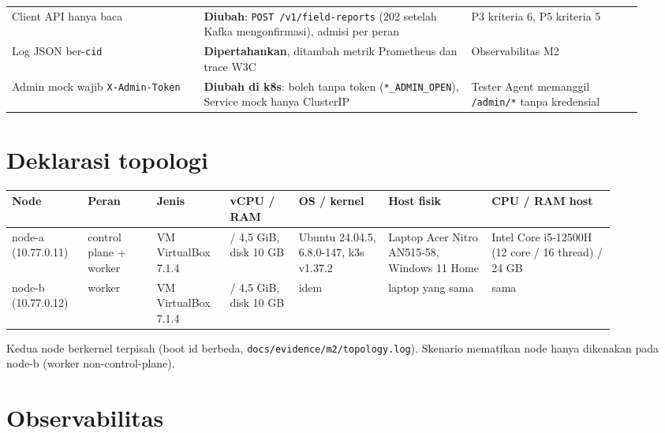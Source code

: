 {\begin{longtable}{@{}>{\raggedright\arraybackslash}p{0.284\linewidth}>{\raggedright\arraybackslash}p{0.398\linewidth}>{\raggedright\arraybackslash}p{0.252\linewidth}@{}}
Client API hanya baca & \textbf{Diubah}: \texttt{POST /\allowbreak{}v1/\allowbreak{}field-\allowbreak{}reports} (202 setelah Kafka mengonfirmasi), admisi per peran & P3 kriteria 6, P5 kriteria 5 \\
Log JSON ber-\texttt{cid} & \textbf{Dipertahankan}, ditambah metrik Prometheus dan trace W3C & Observabilitas M2 \\
Admin mock wajib \texttt{X-\allowbreak{}Admin-\allowbreak{}Token} & \textbf{Diubah di k8s}: boleh tanpa token (\texttt{*\_\allowbreak{}ADMIN\_\allowbreak{}OPEN}), Service mock hanya ClusterIP & Tester Agent memanggil \texttt{/\allowbreak{}admin/\allowbreak{}*} tanpa kredensial \\
\bottomrule
\end{longtable}
}

\section{Deklarasi topologi}

{\small
\begin{longtable}{@{}>{\raggedright\arraybackslash}p{0.104\linewidth}>{\raggedright\arraybackslash}p{0.104\linewidth}>{\raggedright\arraybackslash}p{0.104\linewidth}>{\raggedright\arraybackslash}p{0.104\linewidth}>{\raggedright\arraybackslash}p{0.135\linewidth}>{\raggedright\arraybackslash}p{0.154\linewidth}>{\raggedright\arraybackslash}p{0.181\linewidth}@{}}
\toprule
\textbf{Node} & \textbf{Peran} & \textbf{Jenis} & \textbf{vCPU / RAM} & \textbf{OS / kernel} & \textbf{Host fisik} & \textbf{CPU / RAM host} \\
\midrule
\endhead
node-a (10.77.0.11) & control plane + worker & VM VirtualBox 7.1.4 & 4 / 4,5 GiB, disk 10 GB & Ubuntu 24.04.5, 6.8.0-147, k3s v1.37.2 & Laptop Acer Nitro AN515-58, Windows 11 Home & Intel Core i5-12500H (12 core / 16 thread) / 24 GB \\
node-b (10.77.0.12) & worker & VM VirtualBox 7.1.4 & 4 / 4,5 GiB, disk 10 GB & idem & laptop yang sama & sama \\
\bottomrule
\end{longtable}
}

Kedua node berkernel terpisah (boot id berbeda, \texttt{docs/\allowbreak{}evidence/\allowbreak{}m2/\allowbreak{}topology.\allowbreak{}log}). Skenario mematikan node hanya dikenakan pada node-b (worker non-control-plane).


\section{Observabilitas}

